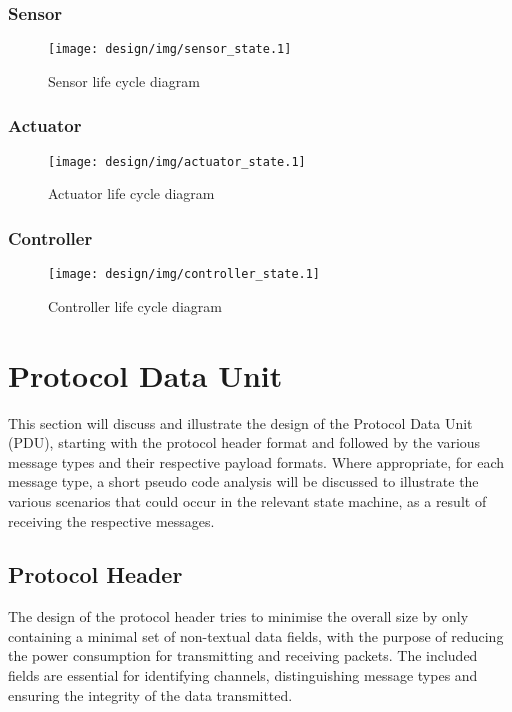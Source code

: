 \subsubsection{Sensor} %
\label{ssub:sensor}
\begin{figure}[h!]
\centering
\texttt{[image: design/img/sensor\_state.1]}
\caption{Sensor life cycle diagram}
\label{fig:sensorstate}
\end{figure}


\subsubsection{Actuator} %
\label{ssub:actuator}
\begin{figure}[h!]
\centering
\texttt{[image: design/img/actuator\_state.1]}
\caption{Actuator life cycle diagram}
\label{fig:actuatorstate}
\end{figure}

\subsubsection{Controller} %
\label{ssub:controller}
\begin{figure}[h!]
\centering
\texttt{[image: design/img/controller\_state.1]}
\caption{Controller life cycle diagram}
\label{fig:controllerstate}
\end{figure}








\section{Protocol Data Unit} %
\label{sec:protocol_data_unit}
This section will discuss and illustrate the design of the Protocol Data Unit (PDU), starting with the protocol header format and followed by the various message types and their respective payload formats. Where appropriate, for each message type, a short pseudo code analysis will be discussed to illustrate the various scenarios that could occur in the relevant state machine, as a result of receiving the respective messages.

\subsection{Protocol Header} %
\label{sub:protocol_header}
The design of the protocol header tries to minimise the overall size by only containing a minimal set of non-textual data fields, with the purpose of reducing the power consumption for transmitting and receiving packets. The included fields are essential for identifying channels, distinguishing message types and ensuring the integrity of the data transmitted.

